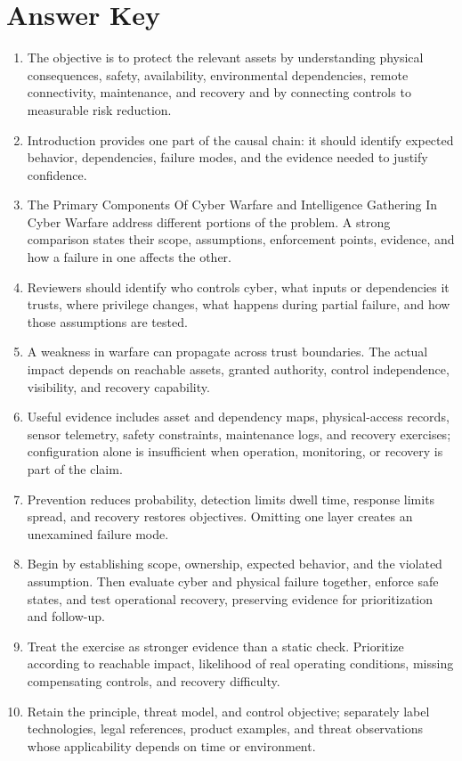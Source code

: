 \documentclass[11pt]{article}
\begin{document}
\section*{Answer Key}
\begin{enumerate}
\item The objective is to protect the relevant assets by understanding physical consequences, safety, availability, environmental dependencies, remote connectivity, maintenance, and recovery and by connecting controls to measurable risk reduction.
\item Introduction provides one part of the causal chain: it should identify expected behavior, dependencies, failure modes, and the evidence needed to justify confidence.
\item The Primary Components Of Cyber Warfare and Intelligence Gathering In Cyber Warfare address different portions of the problem. A strong comparison states their scope, assumptions, enforcement points, evidence, and how a failure in one affects the other.
\item Reviewers should identify who controls cyber, what inputs or dependencies it trusts, where privilege changes, what happens during partial failure, and how those assumptions are tested.
\item A weakness in warfare can propagate across trust boundaries. The actual impact depends on reachable assets, granted authority, control independence, visibility, and recovery capability.
\item Useful evidence includes asset and dependency maps, physical-access records, sensor telemetry, safety constraints, maintenance logs, and recovery exercises; configuration alone is insufficient when operation, monitoring, or recovery is part of the claim.
\item Prevention reduces probability, detection limits dwell time, response limits spread, and recovery restores objectives. Omitting one layer creates an unexamined failure mode.
\item Begin by establishing scope, ownership, expected behavior, and the violated assumption. Then evaluate cyber and physical failure together, enforce safe states, and test operational recovery, preserving evidence for prioritization and follow-up.
\item Treat the exercise as stronger evidence than a static check. Prioritize according to reachable impact, likelihood of real operating conditions, missing compensating controls, and recovery difficulty.
\item Retain the principle, threat model, and control objective; separately label technologies, legal references, product examples, and threat observations whose applicability depends on time or environment.
\end{enumerate}
\end{document}
